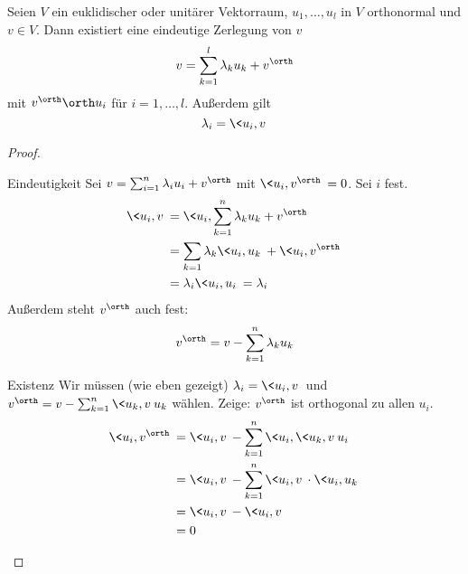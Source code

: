 \documentclass[a4paper, 10pt]{scrbook}
\begin{document}
\begin{prop}
	\label{prop:13.9}
	Seien $V$ ein euklidischer oder unitärer Vektorraum, $u_1,\dotsc, u_l$ in $V$ orthonormal und $v\in V$.
	Dann existiert eine eindeutige Zerlegung von $v$
	\[
		v = \sum_{k=1}^l \lambda_ku_k + v^\orth
	\]
	mit $v^\orth \orth u_i$ für $i=1,\dotsc, l$.
	Außerdem gilt
	\[
		\lambda_i = \<u_i, v\>
	\]
	\begin{proof}
		\begin{seg}{Eindeutigkeit}
			Sei $v=\sum_{i=1}^n\lambda_iu_i + v^\orth$ mit $\<u_i,v^\orth\>=0$.
			Sei $i$ fest.
			\begin{align*}
				\<u_i,v\> &= \<u_i,\sum_{k=1}^n\lambda_k u_k + v^\orth\>\\
						  &=\sum_{k=1}\lambda_k\<u_i,u_k\> +\<u_i,v^\orth\>\\
						  &=\lambda_i\<u_i,u_i\> = \lambda_i
			\end{align*}
			Außerdem steht $v^\orth$ auch fest:
			\[
				v^\orth = v - \sum_{k=1}^n\lambda_ku_k
			\]
		\end{seg}
		\begin{seg}{Existenz}
			Wir müssen (wie eben gezeigt) $\lambda_i=\<u_i,v\>$ und $v^\orth = v-\sum_{k=1}^n\<u_k,v\>u_k$ wählen.
			Zeige: $v^\orth$ ist orthogonal zu allen $u_i$.
			\begin{align*}
				\<u_i,v^\orth\> &= \<u_i,v\> -\sum_{k=1}^n \<u_i,\<u_k,v\>u_i\>\\
								&=\<u_i,v\> -\sum_{k=1}^n \<u_i,v\>\cdot\<u_i,u_k\>\\
					&=\<u_i,v\> - \<u_i,v\>\\
				 &=0
			\end{align*}
		\end{seg}
	\end{proof}
\end{prop}
\end{document}
